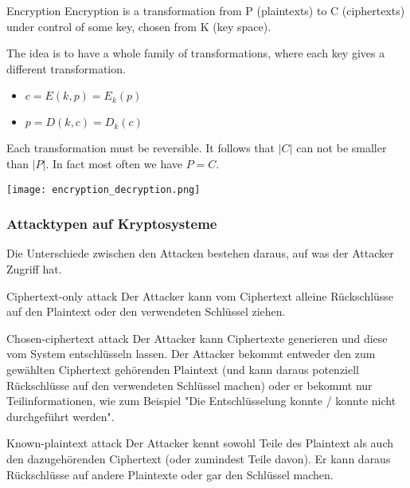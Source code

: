 \begin{concept}{Encryption}
    Encryption is a transformation from P (plaintexts) to C (ciphertexts) under control of some key, chosen from K (key space).
    
    The idea is to have a whole family of transformations, where each key gives a different transformation.
    \begin{itemize}
        \item $c = E(k, p) = E_k(p)$
        \item $p = D(k, c) = D_k(c)$
    \end{itemize}
    
    Each transformation must be reversible. It follows that $|C|$ can not be smaller than $|P|$. In fact most often we have $P = C$.
\end{concept}

\texttt{[image: encryption\_decryption.png]}

\subsubsection{Attacktypen auf Kryptosysteme}

\begin{remark}
    Die Unterschiede zwischen den Attacken bestehen daraus, auf was der Attacker Zugriff hat.
\end{remark}

\begin{definition}{Ciphertext-only attack}
    Der Attacker kann vom Ciphertext alleine Rückschlüsse auf den Plaintext oder den 
    verwendeten Schlüssel ziehen.
\end{definition}

\begin{definition}{Chosen-ciphertext attack}
    Der Attacker kann Ciphertexte generieren und diese vom System entschlüsseln lassen. 
    Der Attacker bekommt entweder den zum gewählten Ciphertext gehörenden Plaintext 
    (und kann daraus potenziell Rückschlüsse auf den verwendeten Schlüssel machen) 
    oder er bekommt nur Teilinformationen, wie zum Beispiel 
    "Die Entschlüsselung konnte / konnte nicht durchgeführt werden".
\end{definition}

\begin{definition}{Known-plaintext attack}
    Der Attacker kennt sowohl Teile des Plaintext als auch den dazugehörenden Ciphertext (oder zumindest Teile davon). 
    Er kann daraus Rückschlüsse auf andere Plaintexte oder gar den Schlüssel machen.
\end{definition}

